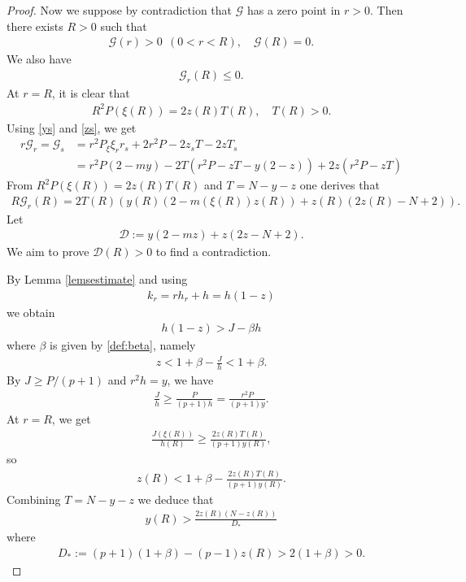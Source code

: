 \documentclass{article}
\theoremstyle{definition} \theoremstyle{remark}
\numberwithin{equation}{section}
\newcommand{\G}{\mathcal{G}}
\begin{document}
\begin{proof}
		Now we suppose by contradiction that $\G$ has a zero point in $r > 0$. Then there exists $R > 0$ such that
		\begin{align*}
			\G(r) > 0 ~~ (0 < r < R), \quad \G(R) = 0.
		\end{align*}
		We also have
		\begin{align*}
			\G_r(R) \le 0.
		\end{align*}
		At $r = R$, it is clear that
		\begin{align*}
			R^2P(\xi(R)) = 2z(R)T(R), \quad T(R) > 0.
		\end{align*}
		Using \eqref{ys} and \eqref{zs}, we get
		\begin{align*}
			r\G_r = \G_s & = r^2P_\xi\xi_r r_s + 2r^2P - 2z_sT - 2zT_s \\
			& = r^2P(2 - my) - 2T(r^2P - zT - y(2-z)) + 2z(r^2P - zT)
		\end{align*}
		From $R^2P(\xi(R)) = 2z(R)T(R)$ and $T = N - y -z$ one derives that
		\begin{align*}
			R\G_r(R) = 2T(R)\left(y(R)\left(2-m(\xi(R))z(R)\right) + z(R)(2z(R) - N +2)\right).
		\end{align*}
		Let
		\begin{align*}
			\mathcal{D} := y(2-mz) + z(2z - N +2).
		\end{align*}
		We aim to prove $\mathcal{D}(R) > 0$ to find a contradiction.
		
\vskip0.2in



		By Lemma \ref{lemsestimate} and using
		\begin{align*}
			k_r = rh_r + h = h(1-z)
		\end{align*}
		we obtain
		\begin{align*}
			h(1-z) > J - \beta h
		\end{align*}
		where $\beta$ is given by \eqref{def:beta}, namely
		\begin{align*}
			z < 1 + \beta - \frac{J}{h} < 1 + \beta.
		\end{align*}
		By $J \ge P/(p+1)$ and $r^2h = y$, we have
		\begin{align*}
			\frac{J}{h} \ge \frac{P}{(p+1)h} = \frac{r^2P}{(p+1)y}.
		\end{align*}
		At $r = R$, we get
		\begin{align*}
			\frac{J(\xi(R))}{h(R)} \ge \frac{2z(R)T(R)}{(p+1)y(R)},
		\end{align*}
		so
		\begin{align*}
			z(R) < 1 + \beta - \frac{2z(R)T(R)}{(p+1)y(R)}.
		\end{align*}
		Combining $T = N -y - z$ we deduce that
		\begin{align} \label{eqy(R)}
			y(R) > \frac{2z(R)(N-z(R))}{D_*}
		\end{align}
		where
		\begin{align*}
			D_* := (p+1)(1+\beta) - (p-1)z(R) > 2(1+\beta) > 0.
		\end{align*}


\end{proof}
\end{document}
